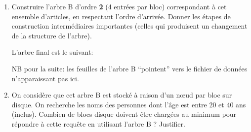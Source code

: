 \begin{enumerate}

\item Construire l'arbre B d'ordre \textbf{2} (4 entrées par bloc)
correspondant à cet ensemble d'articles, en respectant l'ordre d'arrivée. 
Donner les étapes de construction intermédiaires importantes (celles qui produisent 
un changement de la structure de l'arbre).

\begin{solution}

L'arbre final est le suivant:

\begin{small}
\medskip

\begin{center}
\end{center}

\end{small}

NB pour la suite: les feuilles de l'arbre B ``pointent'' vers le fichier de 
donn\'ees n'apparaissant pas ici.

\end{solution}

\item On considère que cet arbre B  est stocké à raison d'un n{\oe}ud par bloc sur disque. On recherche les noms des personnes dont l'âge est entre 20 et 40 ans (inclus). 
Combien de blocs disque doivent être chargées au minimum pour répondre à cette requête en utilisant l'arbre B ? Justifier. 



\end{enumerate}
